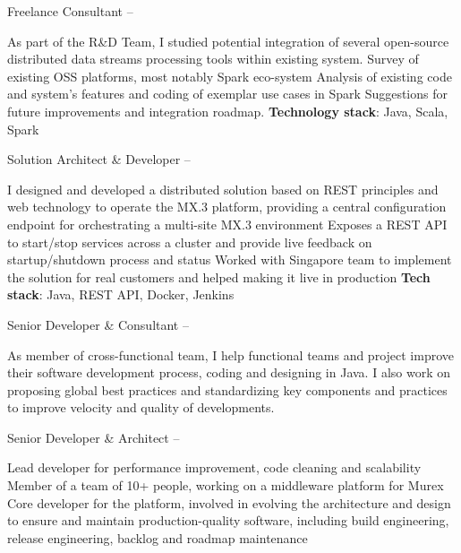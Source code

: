 \documentclass[a4paper,MMMyyyy,nonstopmode]{simpleresumecv}
\begin{document}
\begin{Body}
\begin{Detail}
\end{Detail}


\Entry
Freelance Consultant
\hfill
{} --
\begin{Detail}
  \BulletItem As part of the R\&D Team, I studied potential integration of several open-source distributed data streams processing tools within existing system.
  \SubBulletItem Survey of existing OSS platforms, most notably Spark eco-system
  \SubBulletItem Analysis of existing code and system's features and coding of exemplar use cases in Spark
  \SubBulletItem Suggestions for future improvements and integration roadmap.
  \BulletItem \textbf{Technology stack}: Java, Scala, Spark
\end{Detail}


\Entry
Solution Architect \& Developer
\hfill
{} --
\begin{Detail}
\BulletItem I designed and developed a distributed solution based on REST principles and web technology to operate the MX.3 platform, providing a central configuration endpoint for orchestrating a multi-site MX.3 environment
\BulletItem Exposes a REST API to start/stop services across a cluster and provide live feedback on startup/shutdown process and status
\BulletItem Worked with Singapore team to implement the solution for real customers and helped making it live in production
\BulletItem \textbf{Tech stack}: Java, REST API, Docker, Jenkins
\end{Detail}

\Entry
Senior Developer \& Consultant
\hfill
{} --
\begin{Detail}
As member of cross-functional team, I help functional teams and project improve their software development process, coding and designing in Java. I also work on proposing global best practices and standardizing key components and practices to improve velocity and quality of developments.
\end{Detail}

\Entry
Senior Developer \& Architect
\hfill
{} --
\begin{Detail}
\BulletItem Lead developer for performance improvement, code cleaning and scalability
\BulletItem Member of a team of 10+ people, working on a middleware platform for Murex
\BulletItem Core developer for the platform, involved in evolving the architecture and design to ensure and maintain production-quality software, including build engineering, release engineering, backlog and roadmap maintenance
\end{Detail}


\end{Body}
\end{document}

